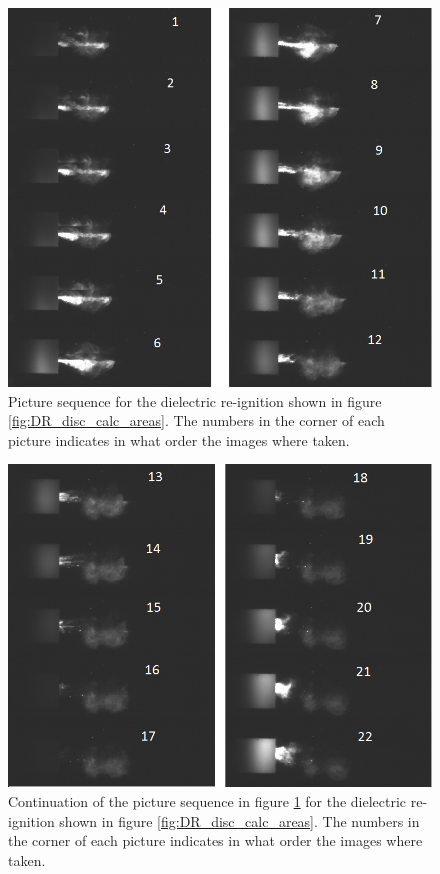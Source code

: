 \documentclass[10pt,b5paper,twoside]{article}
\begin{document}
\begin{figure}[H]
\centering
\includegraphics[scale=0.7, angle =0 ]{Bilder/Results/305_75_DR_TR.png}
\caption{Picture sequence for the dielectric re-ignition shown in figure \ref{fig:DR_disc_calc_areas}. The numbers in the corner of each picture indicates in what order the images where taken.} \label{fig:DR_TR_305_1}
\end{figure}

\begin{figure}[H]
\centering
\includegraphics[scale=0.7, angle =0 ]{Bilder/Results/305_75_DR_TR_2.png}
\caption{Continuation of the picture sequence in figure \ref{fig:DR_TR_305_1} for the dielectric re-ignition shown in figure \ref{fig:DR_disc_calc_areas}. The numbers in the corner of each picture indicates in what order the images where taken.} \label{fig:DR_TR_305_2}
\end{figure}
\end{document}
